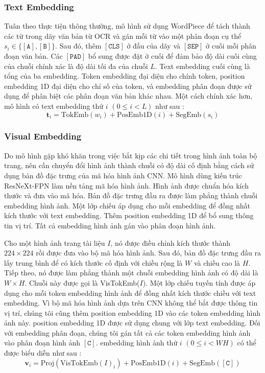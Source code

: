 \subsubsection*{Text Embedding}
Tuân theo thực tiện thông thường, mô hình sử dụng WordPiece để tách thành các từ trong dãy văn bản từ OCR và gán mỗi từ vào một phân đoạn cụ thể $s_i \in \{\mathtt{[A]}, \mathtt{[B]}\}$. Sau đó, thêm $\mathtt{[CLS]}$ ở đầu của dãy và $\mathtt{[SEP]}$ ở cuối mỗi phân đoạn văn bản. Các $\mathtt{[PAD]}$ bổ sung được đặt ở cuối để đảm bảo độ dài cuối cùng của chuỗi chính xác là độ dài tối đa của chuỗi $L$. Text embedding cuối cùng là tổng của ba embedding. Token embedding đại diện cho chính token, position embedding 1D đại diện cho chỉ số của token, và embedding phân đoạn được sử dụng để phân biệt các phân đoạn văn bản khác nhau. Một cách chính xác hơn, mô hình có text embedding thứ $i$ $(0 \leq i < L)$ như sau \cite{xu2022layoutlmv2}:
\[
    \mathbf{t}_i = \text{TokEmb}(w_i) + \text{PosEmb1D}(i) + \text{SegEmb}(s_i)
\]

\subsubsection*{Visual Embedding}
Do mô hình gặp khó khăn trong việc bắt kịp các chi tiết trong hình ảnh toàn bộ trang, nên cần chuyển đổi hình ảnh thành chuỗi có độ dài cố định bằng cách sử dụng bản đồ đặc trưng của mã hóa hình ảnh CNN. Mô hình dùng kiến trúc ResNeXt-FPN làm nền tảng mã hóa hình ảnh. Hình ảnh được chuẩn hóa kích thước và đưa vào mã hóa. Bản đồ đặc trưng đầu ra được làm phẳng thành chuỗi embedding hình ảnh. Một lớp chiếu áp dụng cho mỗi embedding để đồng nhất kích thước với text embedding. Thêm position embedding 1D để bổ sung thông tin vị trí. Tất cả embedding hình ảnh gán vào phân đoạn hình ảnh.

Cho một hình ảnh trang tài liệu $I$, nó được điều chỉnh kích thước thành $224 \times 224$ rồi được đưa vào bộ mã hóa hình ảnh. Sau đó, bản đồ đặc trưng đầu ra lấy trung bình để có kích thước cố định với chiều rộng là $W$ và chiều cao là $H$. Tiếp theo, nó được làm phẳng thành một chuỗi embedding hình ảnh có độ dài là $W \times H$. Chuỗi này được gọi là VisTokEmb($I$). Một lớp chiếu tuyến tính được áp dụng cho mỗi token embedding hình ảnh để đồng nhất kích thước chiều với text embedding. Vì bộ mã hóa hình ảnh dựa trên CNN không thể bắt được thông tin vị trí, chúng tôi cũng thêm position embedding 1D vào các token embedding hình ảnh này. position embedding 1D được sử dụng chung với lớp text embedding. Đối với embedding phân đoạn, chúng tôi gán tất cả các token embedding hình ảnh vào phân đoạn hình ảnh $\mathtt{[C]}$.
embedding hình ảnh thứ $i$ $(0 \leq i < W H)$ có thể được biểu diễn như sau \cite{xu2022layoutlmv2}:
\[
    \mathbf{v}_i = \text{Proj}(\text{VisTokEmb}(I)_i) + \text{PosEmb1D}(i) + \text{SegEmb}([\mathtt{C}])    
\]

